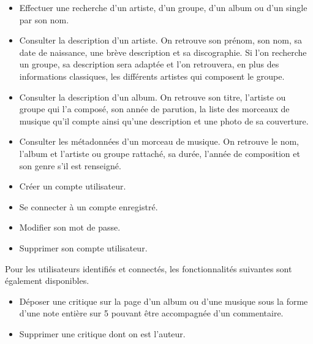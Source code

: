         \begin{paragraphe}
            \begin{itemize}
                \item Effectuer une recherche d'un artiste, d'un groupe, d'un album ou d'un single
                par son nom.
                \item Consulter la description d'un artiste. On retrouve son prénom, son nom, sa
                date de naissance, une brève description et sa discographie. Si l'on
                recherche un groupe, sa description sera adaptée et l'on retrouvera,
                en plus des informations classiques, les différents artistes qui
                composent le groupe.
                \item Consulter la description d'un album. On retrouve son titre,
                l'artiste ou groupe qui l'a composé, son année de parution, la liste des morceaux de 
                musique qu'il compte ainsi qu'une description et une photo de sa couverture.
                \item Consulter les métadonnées d'un morceau de musique. On retrouve
                le nom, l'album et l'artiste ou groupe rattaché, sa durée, l'année de composition
                et son genre s'il est renseigné.
                \item Créer un compte utilisateur.
                \item Se connecter à un compte enregistré.
                \item Modifier son mot de passe.
                \item Supprimer son compte utilisateur.
            \end{itemize}
        \end{paragraphe}

        \begin{paragraphe}
            Pour les utilisateurs identifiés et connectés, les fonctionnalités suivantes sont également 
            disponibles.
        \end{paragraphe}

        \begin{paragraphe}
            \begin{itemize}
                \item Déposer une critique sur la page d'un album ou
                d'une musique sous la forme d'une note entière sur 5 pouvant être accompagnée d'un commentaire.
                \item Supprimer une critique dont on est l'auteur.
            \end{itemize}
        \end{paragraphe}

